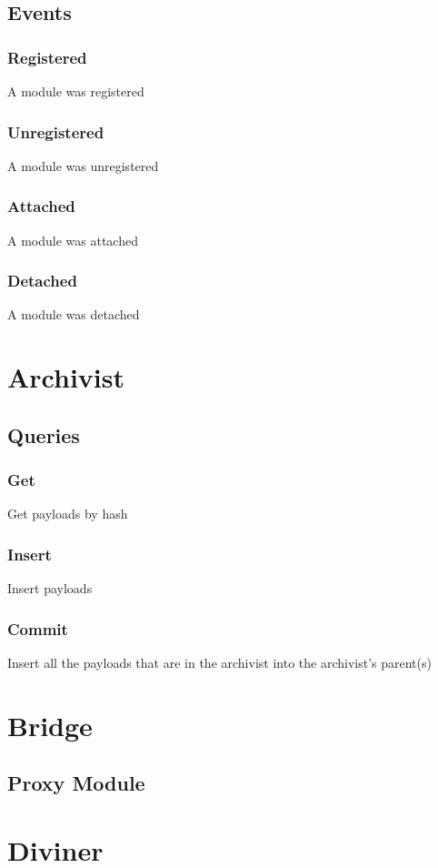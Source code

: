 \documentclass{article}
\begin{document}
\subsection{Events}
\subsubsection{Registered}
A module was registered
\subsubsection{Unregistered}
A module was unregistered
\subsubsection{Attached}
A module was attached
\subsubsection{Detached}
A module was detached

\section{Archivist}
\subsection{Queries}
\subsubsection{Get}
Get payloads by hash
\subsubsection{Insert}
Insert payloads
\subsubsection{Commit}
Insert all the payloads that are in the archivist into the archivist's parent(s)
\section{Bridge}
\subsection{Proxy Module}
\section{Diviner}
\end{document}
